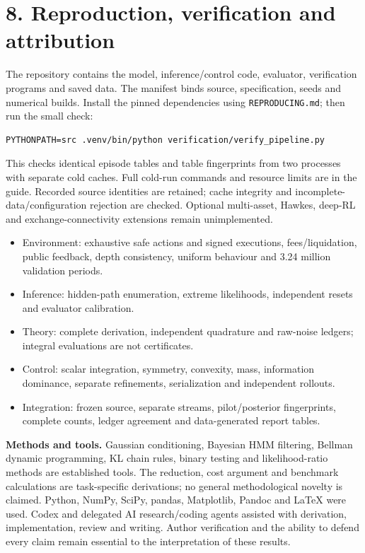 \documentclass[11pt,a4paper]{article}
\begin{document}
\newpage
\section*{8. Reproduction, verification and attribution}
The repository contains the model, inference/control code, evaluator, verification
programs and saved data. The manifest binds source, specification, seeds and
numerical builds. Install the pinned dependencies using \texttt{REPRODUCING.md};
then run the small check:

\begin{verbatim}
PYTHONPATH=src .venv/bin/python verification/verify_pipeline.py
\end{verbatim}

This checks identical episode tables and table fingerprints from two processes
with separate cold caches. Full cold-run commands and resource limits are in the
guide. Recorded source identities are retained; cache integrity and
incomplete-data/configuration rejection are checked.
Optional multi-asset, Hawkes, deep-RL and exchange-connectivity extensions
remain unimplemented.



\begin{itemize}
\item Environment: exhaustive safe actions and signed executions, fees/liquidation,
public feedback, depth consistency, uniform behaviour and 3.24 million validation periods.
\item Inference: hidden-path enumeration, extreme likelihoods, independent resets
and evaluator calibration.
\item Theory: complete derivation, independent quadrature and raw-noise ledgers;
integral evaluations are not certificates.
\item Control: scalar integration, symmetry, convexity, mass, information dominance,
separate refinements, serialization and independent rollouts.
\item Integration: frozen source, separate streams, pilot/posterior fingerprints,
complete counts, ledger agreement and data-generated report tables.
\end{itemize}

\textbf{Methods and tools.} Gaussian conditioning, Bayesian HMM filtering, Bellman
dynamic programming, KL chain rules, binary testing and likelihood-ratio methods
are established tools. The reduction, cost argument and benchmark calculations
are task-specific derivations; no general methodological novelty is claimed.
Python, NumPy, SciPy, pandas, Matplotlib, Pandoc and LaTeX were used. Codex and
delegated AI research/coding agents assisted with derivation, implementation,
review and writing. Author verification and the ability to defend every claim
remain essential to the interpretation of these results.
\end{document}
